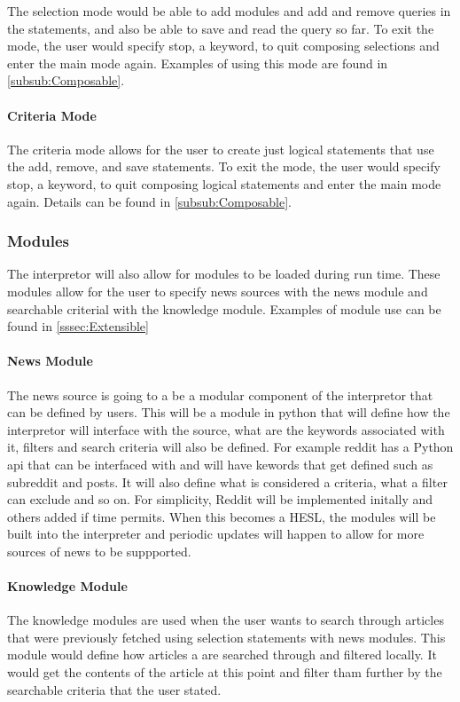 The selection mode would be able to add modules and add and remove queries in the statements, and also be able to save and read the query so far. To exit the mode, the user would specify stop, a keyword, to quit composing selections and enter the main mode again. Examples of using this mode are found in \autoref{subsub:Composable}. 

\paragraph{Criteria Mode}

The criteria mode allows for the user to create just logical statements that use the add, remove, and save statements. To exit the mode, the user would specify stop, a keyword, to quit composing logical statements and enter the main mode again. Details can be found in \autoref{subsub:Composable}.\\


\subsubsection{Modules}

The interpretor will also allow for modules to be loaded during run time. These modules allow for the user to specify news sources with the news module and searchable criterial with the knowledge module. Examples of module use can be found in \autoref{sssec:Extensible}

\paragraph{ News Module }

The news source is going to a be a modular component of the interpretor that can be defined by users. This will be a module in python that will define how the interpretor will interface with the source, what are the keywords associated with it, filters and search criteria will also be defined. For example reddit has a Python api that can be interfaced with and will have kewords that get defined such as subreddit and posts. It will also define what is considered a criteria, what a filter can exclude and so on. For simplicity, Reddit will be implemented initally and others added if time permits. When this becomes a HESL, the modules will be built into the interpreter and periodic updates will happen to allow for more sources of news to be suppported.\\


\paragraph{Knowledge Module}
The knowledge modules are used when the user wants to search through articles that were previously fetched using selection statements with news modules. This module would define how articles a are searched through and filtered locally. It would get the contents of the article at this point and filter tham further by the searchable criteria that the user stated.
